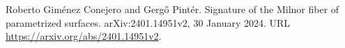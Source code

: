 Roberto Gim\'enez Conejero and Gerg\H{o} Pint\'er.
\newblock Signature of the Milnor fiber of parametrized surfaces.
\newblock arXiv:2401.14951v2, 30 January 2024.
\newblock URL \url{https://arxiv.org/abs/2401.14951v2}.

